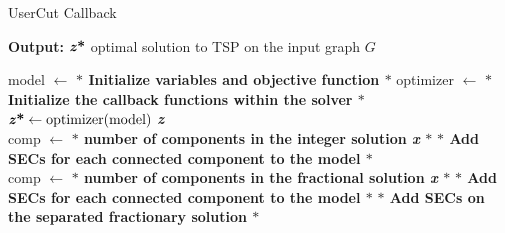 \begin{algorithm}
    \caption{UserCut Callback}\label{UserCut Callback}
    \hspace*{\algorithmicindent} \textbf{Output:} $\textbf{\textit{z}\text{*}} $ optimal solution to TSP on the input graph $G$
    \begin{algorithmic}[1]
  \State model $ \leftarrow $ \textbf{$\ast$ Initialize variables and objective function $\ast$ }
  \State optimizer $ \leftarrow $ \textbf{$\ast$ Initialize the callback functions within the solver $\ast$ }
  \State $\textbf{\textit{z}\text{*}} \gets \text{optimizer(model)}$
  \State \Return \textbf{\textit{z}\text{*}}
\EndFunction
\\
  \State comp $ \leftarrow $ \textbf{$\ast$ number of components in the integer solution \textit{x} $\ast$ }
	\State \textbf{$\ast$ Add SECs for each connected component to the model $\ast$ }
	\EndIf  
	\State \Return 
	\EndFunction
	\\
  \State comp $ \leftarrow $ \textbf{$\ast$ number of components in the fractional solution \textit{x} $\ast$ }
	\State \textbf{$\ast$ Add SECs for each connected component to the model $\ast$ }
	\EndIf
	\State \textbf{$\ast$ Add SECs on the separated fractionary solution $\ast$ }
	\EndIf 
	\State \Return 
	\EndFunction

    \end{algorithmic}
    \label{alg:usercutcall}
    \end{algorithm}
    
